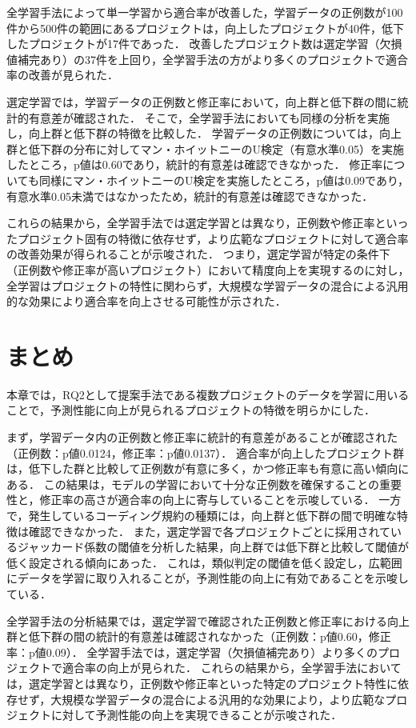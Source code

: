 \documentclass[11pt]{jreport}
\begin{document}
全学習手法によって単一学習から適合率が改善した，学習データの正例数が100件から500件の範囲にあるプロジェクトは，向上したプロジェクトが40件，低下したプロジェクトが17件であった．
改善したプロジェクト数は選定学習（欠損値補完あり）の37件を上回り，全学習手法の方がより多くのプロジェクトで適合率の改善が見られた．

選定学習では，学習データの正例数と修正率において，向上群と低下群の間に統計的有意差が確認された．
そこで，全学習手法においても同様の分析を実施し，向上群と低下群の特徴を比較した．
学習データの正例数については，向上群と低下群の分布に対してマン・ホイットニーのU検定（有意水準0.05）を実施したところ，p値は0.60であり，統計的有意差は確認できなかった．
修正率についても同様にマン・ホイットニーのU検定を実施したところ，p値は0.09であり，有意水準0.05未満ではなかったため，統計的有意差は確認できなかった．

これらの結果から，全学習手法では選定学習とは異なり，正例数や修正率といったプロジェクト固有の特徴に依存せず，より広範なプロジェクトに対して適合率の改善効果が得られることが示唆された．
つまり，選定学習が特定の条件下（正例数や修正率が高いプロジェクト）において精度向上を実現するのに対し，全学習はプロジェクトの特性に関わらず，大規模な学習データの混合による汎用的な効果により適合率を向上させる可能性が示された．

\section{まとめ}

本章では，RQ2として提案手法である複数プロジェクトのデータを学習に用いることで，予測性能に向上が見られるプロジェクトの特徴を明らかにした．

まず，学習データ内の正例数と修正率に統計的有意差があることが確認された（正例数：p値0.0124，修正率：p値0.0137）．
適合率が向上したプロジェクト群は，低下した群と比較して正例数が有意に多く，かつ修正率も有意に高い傾向にある．
この結果は，モデルの学習において十分な正例数を確保することの重要性と，修正率の高さが適合率の向上に寄与していることを示唆している．
一方で，発生しているコーディング規約の種類には，向上群と低下群の間で明確な特徴は確認できなかった．
また，選定学習で各プロジェクトごとに採用されているジャッカード係数の閾値を分析した結果，向上群では低下群と比較して閾値が低く設定される傾向にあった．
これは，類似判定の閾値を低く設定し，広範囲にデータを学習に取り入れることが，予測性能の向上に有効であることを示唆している．

全学習手法の分析結果では，選定学習で確認された正例数と修正率における向上群と低下群の間の統計的有意差は確認されなかった（正例数：p値0.60，修正率：p値0.09）．
全学習手法では，選定学習（欠損値補完あり）より多くのプロジェクトで適合率の向上が見られた．
これらの結果から，全学習手法においては，選定学習とは異なり，正例数や修正率といった特定のプロジェクト特性に依存せず，大規模な学習データの混合による汎用的な効果により，より広範なプロジェクトに対して予測性能の向上を実現できることが示唆された．
\end{document}
